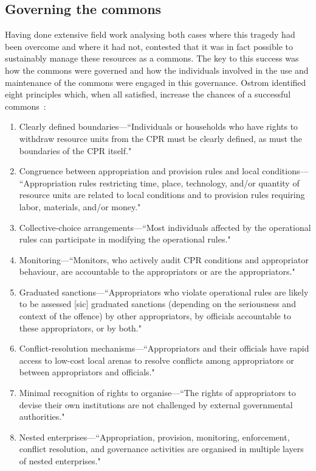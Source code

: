 \subsection{Governing the commons}

Having done extensive field work analysing both cases where this tragedy had been overcome and where it had not, \citet{Ostrom1990} contested that it was in fact possible to sustainably manage these resources as a commons.
The key to this success was  how the commons were governed and how the individuals involved in the use and maintenance of the commons were engaged in this governance. 
Ostrom identified eight principles which, when all satisfied, increase the chances of a successful commons~\cite[pp.\ 91-101]{Ostrom1990}:
\begin{enumerate}
\item Clearly defined boundaries---``Individuals or households who have rights to withdraw resource units from the \ac{CPR} must be clearly defined, as must the boundaries of the \ac{CPR} itself."
\item Congruence between appropriation and provision rules and local conditions--- ``Appropriation rules restricting time, place, technology, and/or quantity of resource units are related to local conditions and to provision rules requiring labor, materials, and/or money."
\item Collective-choice arrangements---``Most individuals affected by the operational rules can participate in modifying the operational rules."
\item Monitoring---``Monitors, who actively audit \ac{CPR} conditions and appropriator behaviour, are accountable to the appropriators or are the appropriators."
\item Graduated sanctions---``Appropriators who violate operational rules are likely to be assessed [sic] graduated sanctions (depending on the seriousness and context of the offence) by other appropriators, by officials accountable to these appropriators, or by both."
\item Conflict-resolution mechanisms---``Appropriators and their officials have rapid access to low-cost local arenas to resolve conflicts among appropriators or between appropriators and officials."
\item Minimal recognition of rights to organise---``The rights of appropriators to devise their own institutions are not challenged by external governmental authorities."
\item Nested enterprises---``Appropriation, provision, monitoring, enforcement, conflict resolution, and governance activities are organised in multiple layers of nested enterprises."
\end{enumerate}


